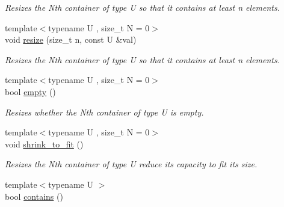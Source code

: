 \begin{DoxyCompactItemize}
\begin{DoxyCompactList}\small\item\em Resizes the Nth container of type U so that it contains at least n elements. \end{DoxyCompactList}\item 
\hypertarget{classheterogeneous_1_1heterodeque_3_01_t_00_01_types_8_8_8_4_a4a803dc0b62cdb493ee8bea79560bd98}{}{\footnotesize template$<$typename U , size\+\_\+t N = 0$>$ }\\void \hyperlink{classheterogeneous_1_1heterodeque_3_01_t_00_01_types_8_8_8_4_a4a803dc0b62cdb493ee8bea79560bd98}{resize} (size\+\_\+t n, const U \&val)\label{classheterogeneous_1_1heterodeque_3_01_t_00_01_types_8_8_8_4_a4a803dc0b62cdb493ee8bea79560bd98}

\begin{DoxyCompactList}\small\item\em Resizes the Nth container of type U so that it contains at least n elements. \end{DoxyCompactList}\item 
\hypertarget{classheterogeneous_1_1heterodeque_3_01_t_00_01_types_8_8_8_4_a7692e40241b0d42ffb17d41bd090a6b0}{}{\footnotesize template$<$typename U , size\+\_\+t N = 0$>$ }\\bool \hyperlink{classheterogeneous_1_1heterodeque_3_01_t_00_01_types_8_8_8_4_a7692e40241b0d42ffb17d41bd090a6b0}{empty} ()\label{classheterogeneous_1_1heterodeque_3_01_t_00_01_types_8_8_8_4_a7692e40241b0d42ffb17d41bd090a6b0}

\begin{DoxyCompactList}\small\item\em Resizes whether the Nth container of type U is empty. \end{DoxyCompactList}\item 
\hypertarget{classheterogeneous_1_1heterodeque_3_01_t_00_01_types_8_8_8_4_abf67a45629efcf65fa0784f214ef6061}{}{\footnotesize template$<$typename U , size\+\_\+t N = 0$>$ }\\void \hyperlink{classheterogeneous_1_1heterodeque_3_01_t_00_01_types_8_8_8_4_abf67a45629efcf65fa0784f214ef6061}{shrink\+\_\+to\+\_\+fit} ()\label{classheterogeneous_1_1heterodeque_3_01_t_00_01_types_8_8_8_4_abf67a45629efcf65fa0784f214ef6061}

\begin{DoxyCompactList}\small\item\em Resizes the Nth container of type U reduce its capacity to fit its size. \end{DoxyCompactList}\item 
\hypertarget{classheterogeneous_1_1heterodeque_3_01_t_00_01_types_8_8_8_4_a7e876428e3c61d8dd88c6a5e45f8fe06}{}{\footnotesize template$<$typename U $>$ }\\bool \hyperlink{classheterogeneous_1_1heterodeque_3_01_t_00_01_types_8_8_8_4_a7e876428e3c61d8dd88c6a5e45f8fe06}{contains} ()\label{classheterogeneous_1_1heterodeque_3_01_t_00_01_types_8_8_8_4_a7e876428e3c61d8dd88c6a5e45f8fe06}


\end{DoxyCompactItemize}
